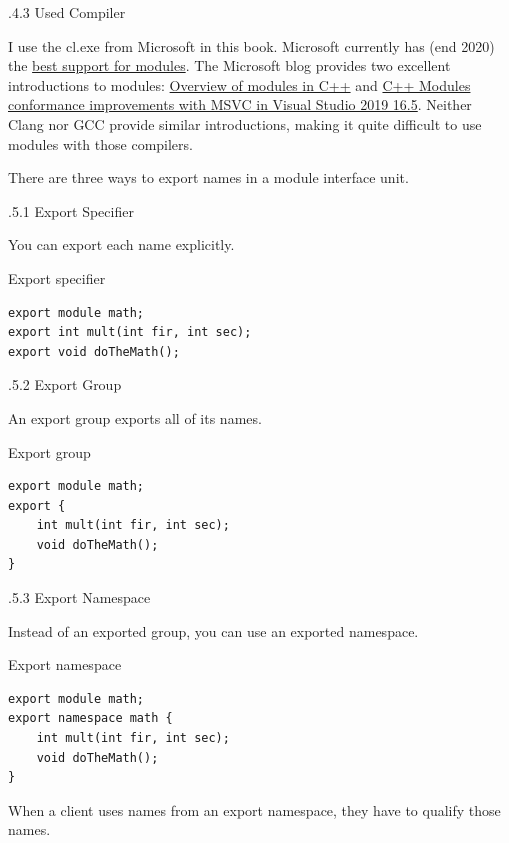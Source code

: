 .4.3\hspace{0.2cm} Used Compiler

I use the cl.exe from Microsoft in this book. Microsoft currently has (end 2020) the \href{https://en.cppreference.com/w/cpp/compiler_support}{best support for modules}. The Microsoft blog provides two excellent introductions to modules: \href{https://docs.microsoft.com/en-us/cpp/cpp/modules-cpp?view=msvc-160&viewFallbackFrom=vs-2019}{Overview of modules in C++} and \href{https://devblogs.microsoft.com/cppblog/c-modules-conformance-improvements-with-msvc-in-visual-studio-2019-16-5/}{C++ Modules conformance improvements with MSVC in Visual Studio 2019 16.5}. Neither Clang nor GCC provide similar introductions, making it quite difficult to use modules with those compilers.



There are three ways to export names in a module interface unit.

.5.1\hspace{0.2cm} Export Specifier

You can export each name explicitly.

\noindent
Export specifier
\begin{lstlisting}[style=styleCXX]
export module math;
export int mult(int fir, int sec);
export void doTheMath();
\end{lstlisting}

.5.2\hspace{0.2cm} Export Group

An export group exports all of its names.

\noindent
Export group
\begin{lstlisting}[style=styleCXX]
export module math;
export {
	int mult(int fir, int sec);
	void doTheMath();
}
\end{lstlisting}

.5.3\hspace{0.2cm} Export Namespace

Instead of an exported group, you can use an exported namespace.

\noindent
Export namespace
\begin{lstlisting}[style=styleCXX]
export module math;
export namespace math {
	int mult(int fir, int sec);
	void doTheMath();
}
\end{lstlisting}

When a client uses names from an export namespace, they have to qualify those names.

